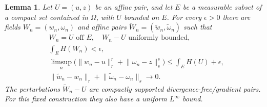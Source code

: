 \documentclass[11pt]{article}
\newtheorem{lemma}[lemma]{Lemma}
\theoremstyle{remark}
\newcommand{\norm}[2]{\lVert #1\rVert_{#2}}
\begin{document}
\begin{lemma}\label{lem:masks}
Let $U=(u,z)$ be an affine pair, and let $E$ be a measurable subset
of a compact set contained in $\Omega$, with $U$ bounded on $E$.
For every $\epsilon>0$ there are fields $W_n=(w_n,\omega_n)$ and
affine pairs $\widetilde W_n=(\widetilde w_n,\widetilde\omega_n)$ such that
\begin{align}
 &W_n=U\text{ off }E,\quad W_n-U\text{ uniformly bounded},\label{eq:target-support}\\
 &\int_E H(W_n)<\epsilon,\label{eq:target-H}\\
 &\limsup_n\big(\norm{w_n-u}{r}^r+\norm{\omega_n-z}{s}^s\big)
      \le\int_E H(U)+\epsilon,\label{eq:target-cost}\\
 &\norm{\widetilde w_n-w_n}{r}
   +\norm{\widetilde\omega_n-\omega_n}{s}\longrightarrow0.
   \label{eq:affine-approx}
\end{align}
The perturbations $\widetilde W_n-U$ are compactly supported
divergence-free/gradient pairs. For this fixed construction they also
have a uniform $L^\infty$ bound.
\end{lemma}
\end{document}

